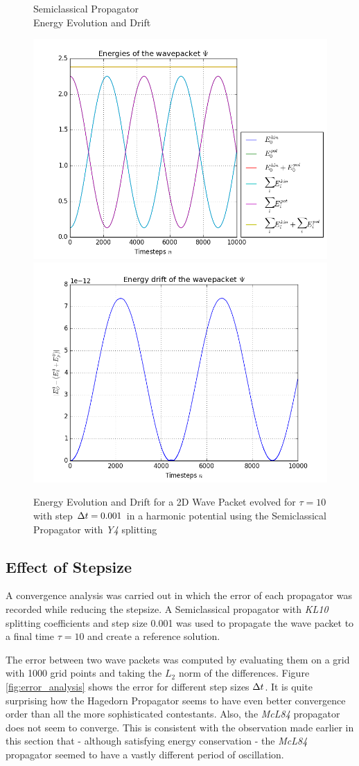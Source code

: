 \begin{figure}[ht]
	\centering
	\begin{minipage}[c]{\textwidth}
		\begin{center}
			\large Semiclassical Propagator \\[1mm]
			\normalsize Energy Evolution and Drift
			\vspace{4mm}
		\end{center}
	\end{minipage}
	\includegraphics[width=.45\textwidth]{figures/energy_Semiclassical.png}
	\includegraphics[width=.45\textwidth]{figures/drift_Semiclassical.png}
	\caption{Energy Evolution and Drift for a 2D Wave Packet evolved for $\tau = 10$ with step $\Delta t = 0.001$ in a harmonic potential using the Semiclassical Propagator with \emph{Y4} splitting}
	\label{fig:energy_Semiclassical}
\end{figure}


\subsection{Effect of Stepsize}
\label{subsec:convergence}
%
A convergence analysis was carried out in which the error of each propagator was recorded while reducing the stepsize.
A Semiclassical propagator with \emph{KL10} splitting coefficients and step size 0.001 was used to propagate the wave packet to a final time $\tau = 10$ and create a reference solution.
\par\medskip
%
The error between two wave packets was computed by evaluating them on a grid with 1000 grid points and taking the $L_2$ norm of the differences.
Figure \ref{fig:error_analysis} shows the error for different step sizes $\Delta t$.
It is quite surprising how the Hagedorn Propagator seems to have even better convergence order than all the more sophisticated contestants.
Also, the \emph{McL84} propagator does not seem to converge. This is consistent with the observation made earlier in this section that - although satisfying energy conservation - the \emph{McL84} propagator seemed to have a vastly different period of oscillation.

